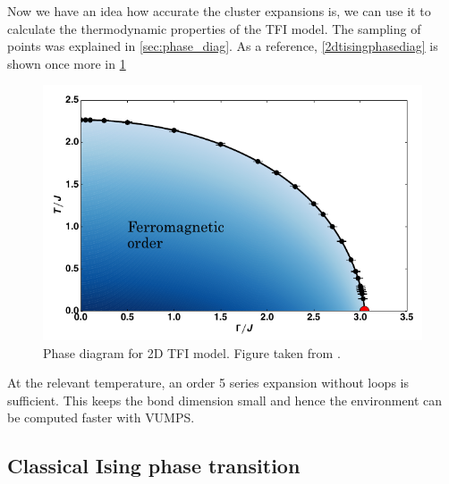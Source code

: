 
Now we have an idea how accurate the cluster expansions is, we can use it to calculate the thermodynamic properties of the \Gls{TFI} model. The sampling of points was explained in \cref{sec:phase_diag}. As a reference, \cref{2dtisingphasediag} is shown once more in \cref{2dtisingphasediag2}
\begin{figure}[!htbp]
  \center
  \includegraphics[width=\textwidth]{Figuren/phsyics/2disingphase.png}
  \caption{Phase diagram for 2D \Gls{TFI} model. Figure taken from \cite{Hesselmann2016}.}
  \label{2dtisingphasediag2}
\end{figure}
At the relevant temperature, an order 5 series expansion without loops is sufficient. This keeps the bond dimension small and hence the environment can be computed faster with \Gls{VUMPS}.

\subsection{Classical Ising phase transition}

